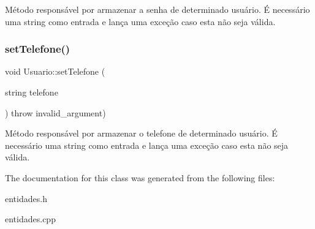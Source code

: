 Método responsável por armazenar a senha de determinado usuário. É necessário uma string como entrada e lança uma exceção caso esta não seja válida. \mbox{\label{classUsuario_adae349ec93a5a83bb4e2b379a181431b}} 
\subsubsection{\texorpdfstring{set\+Telefone()}{setTelefone()}}
{\footnotesize\ttfamily void Usuario\+::set\+Telefone (\begin{DoxyParamCaption}\item[{string}]{telefone }\end{DoxyParamCaption}) throw  invalid\+\_\+argument) }

Método responsável por armazenar o telefone de determinado usuário. É necessário uma string como entrada e lança uma exceção caso esta não seja válida. 

The documentation for this class was generated from the following files\+:\begin{DoxyCompactItemize}
\item 
entidades.\+h\item 
entidades.\+cpp\end{DoxyCompactItemize}
